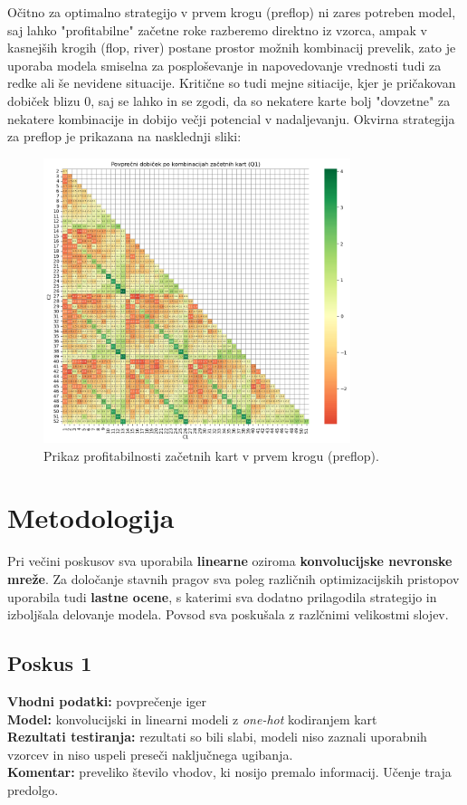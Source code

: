 \documentclass[a4paper,12pt]{article}
\begin{document}
\vspace{0.3cm}
\noindent
Očitno za optimalno strategijo v prvem krogu (preflop) ni zares potreben model, saj lahko "profitabilne" začetne roke razberemo direktno iz vzorca, 
ampak v kasnejših krogih (flop, river) postane prostor možnih kombinacij prevelik, zato je uporaba modela smiselna za posploševanje in napovedovanje 
vrednosti tudi za redke ali še nevidene situacije. Kritične so tudi mejne sitiacije, kjer je pričakovan dobiček blizu 0, saj se lahko in se zgodi, da
so nekatere karte bolj "dovzetne" za nekatere kombinacije in dobijo večji potencial v nadaljevanju. Okvirna strategija za preflop je prikazana na nasklednji sliki:

\begin{figure}[h!]
    \centering
    \includegraphics[width=0.8\textwidth]{porazdelitev.png}
    \caption{Prikaz profitabilnosti začetnih kart v prvem krogu (preflop).}
    \label{fig:preflop}
\end{figure}

\section{Metodologija}

Pri večini poskusov sva uporabila \textbf{linearne} oziroma 
\textbf{konvolucijske nevronske mreže}. 
Za določanje stavnih pragov sva poleg različnih optimizacijskih pristopov 
uporabila tudi \textbf{lastne ocene}, s katerimi sva dodatno prilagodila 
strategijo in izboljšala delovanje modela. Povsod sva poskušala z razlčnimi velikostmi
slojev.


\subsection{Poskus 1}
\textbf{Vhodni podatki:} povprečenje iger \\
\textbf{Model:} konvolucijski in linearni modeli z \textit{one-hot} kodiranjem kart \\
\textbf{Rezultati testiranja:} rezultati so bili slabi, modeli niso zaznali uporabnih vzorcev in niso uspeli preseči naključnega ugibanja. \\
\textbf{Komentar:} preveliko število vhodov, ki nosijo premalo informacij. Učenje traja predolgo.
\end{document}
